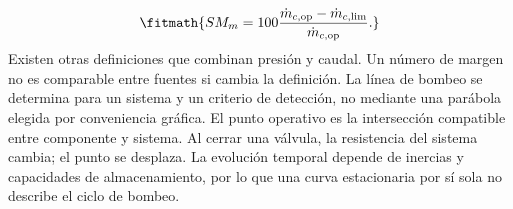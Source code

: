 \documentclass[10pt,openany]{book}
\begin{document}
\[
\fitmath{SM_m=100\frac{\dot m_{c,\mathrm{op}}-\dot m_{c,\mathrm{lim}}}{\dot m_{c,\mathrm{op}}}.}
\]
Existen otras definiciones que combinan presión y caudal. Un número de margen no es comparable entre fuentes si cambia la definición. La línea de bombeo se determina para un sistema y un criterio de detección, no mediante una parábola elegida por conveniencia gráfica.
El punto operativo es la intersección compatible entre componente y sistema. Al cerrar una válvula, la resistencia del sistema cambia; el punto se desplaza. La evolución temporal depende de inercias y capacidades de almacenamiento, por lo que una curva estacionaria por sí sola no describe el ciclo de bombeo.

\par\vspace{\baselineskip}
\end{document}
